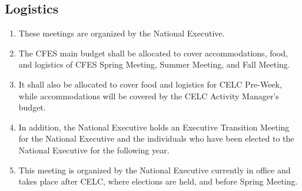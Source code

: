 \subsection{Logistics}
\label{logistics}

\begin{enumerate}
 \item
  These meetings are organized by the National Executive.
 \item
  The CFES main budget shall be allocated to cover accommodations, food, and logistics of CFES Spring Meeting, Summer Meeting, and Fall Meeting.
 \item
  It shall also be allocated to cover food and logistics for CELC Pre-Week, while accommodations will be covered by the CELC Activity Manager's budget.
 \item
  In addition, the National Executive holds an Executive Transition Meeting for the National Executive and the individuals who have been elected to the National Executive for the following year.
 \item
  This meeting is organized by the National Executive currently in office and takes place after CELC, where elections are held, and before Spring Meeting.
\end{enumerate}

